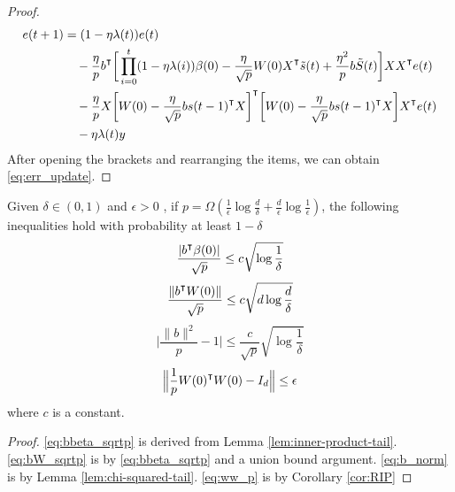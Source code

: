 \begin{proof}
\begin{equation*}
\begin{aligned}
    e(t+1) &= (1-\eta\lambda(t))e(t) \\
    &\quad-\frac{\eta}{p}b\transpose\bigg[ \prod_{i=0}^{t}(1-\eta\lambda(i))\beta(0) -\frac{\eta}{\sqrt p}W(0)X\transpose \tilde{s}(t) +\frac{\eta^2}{p}b \tilde{S}(t)\bigg]XX\transpose e(t) \\
    &\quad - \frac{\eta}{p}X\bigg[W(0) -\frac{\eta}{\sqrt p}bs(t-1)\transpose X\bigg]\transpose \bigg[W(0) -\frac{\eta}{\sqrt p}bs(t-1)\transpose X\bigg]X\transpose e(t)\\
    &\quad - \eta\lambda(t)y
\end{aligned}
\end{equation*} 
After opening the brackets and rearranging the items, we can obtain \eqref{eq:err_update}.
\end{proof}

\begin{lemma}
\label{lma:ineqs_2}
Given $\delta\in(0,1)$ and $\epsilon>0$ , if $p=\Omega(\frac{1}{\epsilon}\log\frac{d}{\delta}+\frac{d}{\epsilon}\log\frac{1}{\epsilon})$, the following inequalities hold with probability at least $1-\delta$
\begin{equation}
\label{eq:bbeta_sqrtp}
\frac{|b\transpose\beta(0)|}{\sqrt p}\leq c\sqrt{\log\frac{1}{\delta}}
\end{equation}
\begin{equation}
\label{eq:bW_sqrtp}
\frac{\|b\transpose W(0)\|}{\sqrt p}\leq c\sqrt{d\log\frac{d}{\delta}}
\end{equation}
\begin{equation}
\label{eq:b_norm}
\Big|\frac{\|b\|^2}{p}-1\Big| \leq  \frac{c}{\sqrt p}\sqrt {\log \frac{1}{\delta}}
\end{equation}
\begin{equation}
\label{eq:ww_p}
\Big\|\frac{1}{p}W(0)\transpose W(0) - I_d \Big\|\leq \epsilon
\end{equation}
where $c$ is a constant.
\end{lemma}

\begin{proof}
\eqref{eq:bbeta_sqrtp} is derived from Lemma \ref{lem:inner-product-tail}. \eqref{eq:bW_sqrtp} is by \eqref{eq:bbeta_sqrtp} and a union bound argument. \eqref{eq:b_norm} is by Lemma \ref{lem:chi-squared-tail}. \eqref{eq:ww_p} is by Corollary \ref{cor:RIP}
\end{proof}

